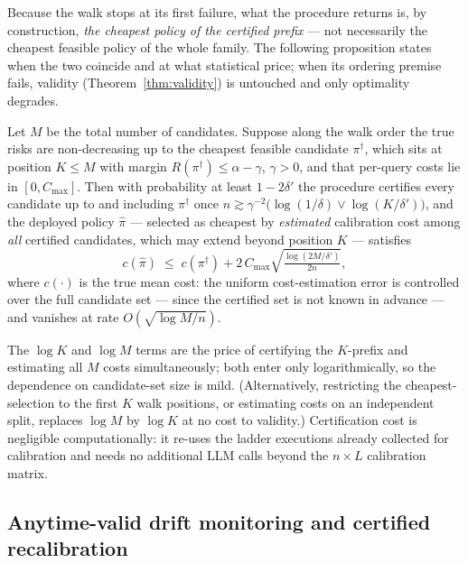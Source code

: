 Because the walk stops at its first failure, what the procedure
returns is, by construction, \emph{the cheapest policy of the
certified prefix} --- not necessarily the cheapest feasible policy of
the whole family. The following proposition states when the two
coincide and at what statistical price; when its ordering premise
fails, validity (Theorem~\ref{thm:validity}) is untouched and only
optimality degrades.

\begin{proposition}
\label{prop:consistency}
Let $M$ be the total number of candidates. Suppose along the walk
order the true risks are non-decreasing up to the cheapest feasible
candidate $\pi^\dagger$, which sits at position $K \le M$ with margin
$R(\pi^\dagger) \le \alpha - \gamma$, $\gamma > 0$, and that per-query
costs lie in $[0, C_{\max}]$. Then with probability at least
$1 - 2\delta'$ the procedure certifies every candidate up to and
including $\pi^\dagger$ once
$n \gtrsim \gamma^{-2}\big(\log(1/\delta) \vee \log(K/\delta')\big)$,
and the deployed policy $\hat\pi$ --- selected as cheapest by
\emph{estimated} calibration cost among \emph{all} certified
candidates, which may extend beyond position $K$ --- satisfies
\[
c(\hat\pi) \;\le\; c(\pi^\dagger)
+ 2\,C_{\max}\sqrt{\tfrac{\log(2M/\delta')}{2n}},
\]
where $c(\cdot)$ is the true mean cost: the uniform cost-estimation
error is controlled over the full candidate set --- since the certified
set is not known in advance --- and vanishes at rate
$O(\sqrt{\log M / n})$.
\end{proposition}

The $\log K$ and $\log M$ terms are the price of certifying the
$K$-prefix and estimating all $M$ costs simultaneously; both enter
only logarithmically, so the dependence on candidate-set size is mild.
(Alternatively, restricting the cheapest-selection to the first
$K$ walk positions, or estimating costs on an independent split,
replaces $\log M$ by $\log K$ at no cost to validity.) Certification
cost is negligible computationally: it re-uses the ladder executions
already collected for calibration and needs no additional LLM calls
beyond the $n \times L$ calibration matrix.

\subsection{Anytime-valid drift monitoring and certified recalibration}
\label{sec:monitor}

